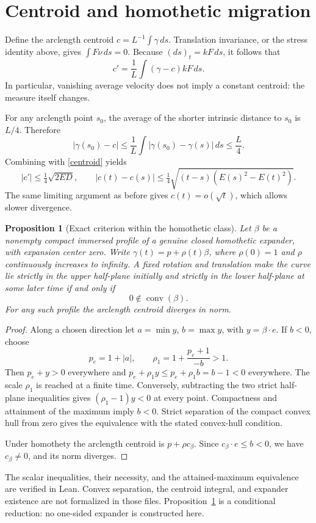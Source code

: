 \documentclass[11pt,a4paper]{article}
\newtheorem{proposition}[theorem]{Proposition}
\begin{document}
\section{Centroid and homothetic migration}
Define the arclength centroid $c=L^{-1}\int\gamma\,ds$. Translation invariance, or the stress identity above, gives $\int F\nu\,ds=0$. Because $(ds)_t=kF\,ds$, it follows that
\begin{equation}\label{centroid}
 c'=\frac1L\int(\gamma-c)kF\,ds.
\end{equation}
In particular, vanishing average velocity does not imply a constant centroid: the measure itself changes.

For any arclength point $s_0$, the average of the shorter intrinsic distance to $s_0$ is $L/4$. Therefore
\[
 |\gamma(s_0)-c|\le\frac1L\int|\gamma(s_0)-\gamma(s)|\,ds\le\frac L4.
\]
Combining with \eqref{centroid} yields
\[
 |c'|\le\tfrac14\sqrt{2ED},\qquad
 |c(t)-c(s)|\le\tfrac14\sqrt{(t-s)(E(s)^2-E(t)^2)}.
\]
The same limiting argument as before gives $c(t)=o(\sqrt t)$, which allows slower divergence.

\begin{proposition}[Exact criterion within the homothetic class]\label{migration}
Let $\beta$ be a nonempty compact immersed profile of a genuine closed homothetic expander, with expansion center zero. Write
$\gamma(t)=p+\rho(t)\beta$, where $\rho(0)=1$ and $\rho$ continuously increases to infinity. A fixed rotation and translation make the curve lie strictly in the upper half-plane initially and strictly in the lower half-plane at some later time if and only if
\[
 0\notin\operatorname{conv}(\beta).
\]
For any such profile the arclength centroid diverges in norm.
\end{proposition}
\begin{proof}
Along a chosen direction let $a=\min y$, $b=\max y$, with $y=\beta\cdot e$. If $b<0$, choose
\[
 p_e=1+|a|,\qquad \rho_1=1+\frac{p_e+1}{-b}>1.
\]
Then $p_e+y>0$ everywhere and
$p_e+\rho_1y\le p_e+\rho_1b=b-1<0$ everywhere. The scale $\rho_1$ is reached at a finite time. Conversely, subtracting the two strict half-plane inequalities gives $(\rho_1-1)y<0$ at every point. Compactness and attainment of the maximum imply $b<0$. Strict separation of the compact convex hull from zero gives the equivalence with the stated convex-hull condition.

Under homothety the arclength centroid is $p+\rho c_\beta$. Since $c_\beta\cdot e\le b<0$, we have $c_\beta\ne0$, and its norm diverges.
\end{proof}
The scalar inequalities, their necessity, and the attained-maximum equivalence are verified in Lean. Convex separation, the centroid integral, and expander existence are not formalized in those files. Proposition~\ref{migration} is a conditional reduction: no one-sided expander is constructed here.
\end{document}

